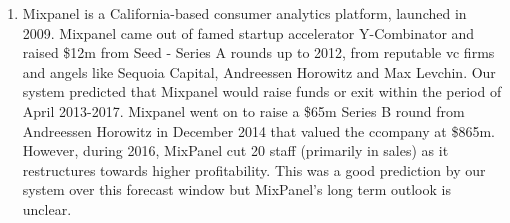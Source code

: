 \begin{enumerate}
\item Mixpanel is a California-based consumer analytics platform, launched in 2009. Mixpanel came out of famed startup accelerator Y-Combinator and raised \$12m from Seed - Series A rounds up to 2012, from reputable \gls{vc} firms and angels like Sequoia Capital, Andreessen Horowitz and Max Levchin. Our system predicted that Mixpanel would raise funds or exit within the period of April 2013-2017.  Mixpanel went on to raise a \$65m Series B round from Andreessen Horowitz in December 2014 that valued the ccompany at \$865m. However, during 2016, MixPanel cut 20 staff (primarily in sales) as it restructures towards higher profitability. This was a good prediction by our system over this forecast window but MixPanel's long term outlook is unclear.

\end{enumerate}
